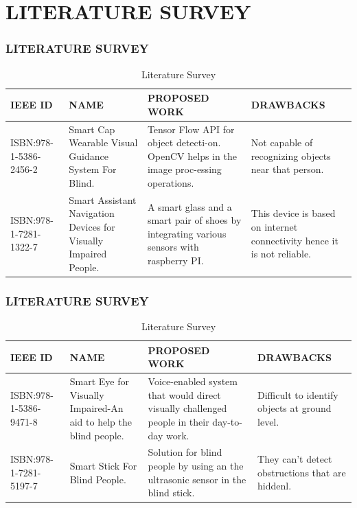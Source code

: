 \documentclass[
	11pt, %
	t, %
	aspectratio=169, %
]{beamer}
\begin{document}
\section{LITERATURE SURVEY}
\begin{frame}
	\frametitle{LITERATURE SURVEY}
	\begin{table}
		\begin{tabular}{p{2.5cm} p{3.4cm} p{3.4cm} p{3.4cm}}
			\toprule
			\textbf{IEEE ID} & \textbf{NAME} & \textbf{PROPOSED WORK} & \textbf{DRAWBACKS}\\
			\midrule
			ISBN:978-1-5386-2456-2 & Smart Cap Wearable Visual Guidance System For Blind. & Tensor Flow API for object detecti-on. OpenCV helps in the image proc-essing operations. & Not capable of recognizing objects near that person. \\
			ISBN:978-1-7281-1322-7 & Smart Assistant Navigation Devices for Visually Impaired People. & A smart glass and a smart pair of shoes by integrating various sensors with raspberry PI. & This device is based on internet connectivity hence it is not reliable. \\
			\bottomrule
		\end{tabular}
		\caption{Literature Survey}
	\end{table}
\end{frame}
\begin{frame}
	\frametitle{LITERATURE SURVEY}
	\begin{table}
		\begin{tabular}{p{2.5cm} p{3.4cm} p{3.4cm} p{3.4cm}}
			\toprule
			\textbf{IEEE ID} & \textbf{NAME} & \textbf{PROPOSED WORK} & \textbf{DRAWBACKS}\\
			\midrule
			ISBN:978-1-5386-9471-8 & Smart Eye for Visually Impaired-An aid to help the blind people. & Voice-enabled system that would direct visually challenged people in their day-to-day work. &  Difficult to identify objects at ground level. \\
			ISBN:978-1-7281-5197-7 & Smart Stick For Blind People. & Solution for blind people by using an the ultrasonic sensor in the blind stick. & They can’t detect obstructions that are hiddenl. \\
			\bottomrule
		\end{tabular}
		\caption{Literature Survey}
	\end{table}
\end{frame}
\end{document}

